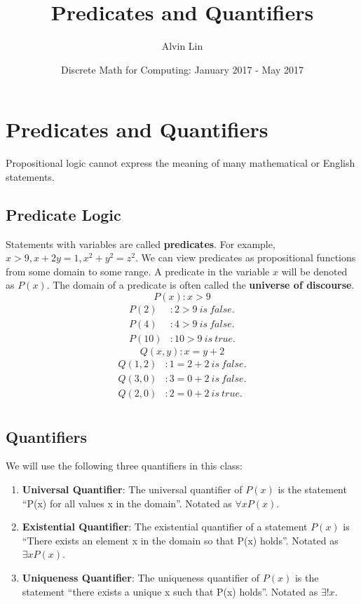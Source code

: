 \documentclass{math}
\title{Predicates and Quantifiers}
\author{Alvin Lin}
\date{Discrete Math for Computing: January 2017 - May 2017}
\begin{document}
\maketitle

\section*{Predicates and Quantifiers}
Propositional logic cannot express the meaning of many mathematical or
English statements.

\subsection*{Predicate Logic}
Statements with variables are called \textbf{predicates}. For example,
\( x > 9, x+2y = 1, x^{2}+y^{2} = z^{2} \).
We can view predicates as propositional functions from some domain to some
range. A predicate in the variable \( x \) will be denoted as \( P(x) \). The
domain of a predicate is often called the \textbf{universe of discourse}.
\[ P(x): x > 9 \]
\begin{align*}
  P(2)&: 2 > 9\ is\ false. \\
  P(4)&: 4 > 9\ is\ false. \\
  P(10)&: 10 > 9\ is\ true.
\end{align*}
\[ Q(x,y): x = y+2 \]
\begin{align*}
  Q(1,2)&: 1 = 2+2\ is\ false. \\
  Q(3,0)&: 3 = 0+2\ is\ false. \\
  Q(2,0)&: 2 = 0+2\ is\ true. \\
\end{align*}

\subsection*{Quantifiers}
We will use the following three quantifiers in this class:
\begin{enumerate}
  \item \textbf{Universal Quantifier}: The universal quantifier of \( P(x) \)
    is the statement ``P(x) for all values x in the domain''. Notated as
    \( \forall{x}P(x) \).
  \item \textbf{Existential Quantifier}: The existential quantifier of a
    statement \( P(x) \) is ``There exists an element x in the domain so
    that P(x) holds''. Notated as
    \( \exists{x}P(x) \).
  \item \textbf{Uniqueness Quantifier}: The uniqueness quantifier of \( P(x) \)
    is the statement ``there exists a unique x such that P(x) holds''. Notated
    as \( \exists{!x} \).
\end{enumerate}
\end{document}
